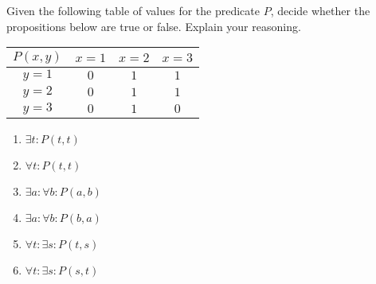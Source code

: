 	\begin{xca}
	
	Given the following table of values for the predicate $P$, decide whether the propositions below are true or false.  Explain your reasoning.
	
	\begin{table}[h!]
		\begin{center}
			\label{tab:table1}
			\begin{tabular}{c|c|c|c|}
				$P(x,y)$ &$x=1$ & $x=2$ & $x=3$  \\
				\hline
				$y=1$    &   $0$        &     $1$       &     $1$      \\
				\hline
				$y=2$   &    $0$       &     $1$        &    $1$      \\
				\hline
				$y=3$   &    $0$       &      $1$        &   $0$       \\
				\hline
			\end{tabular}
		\end{center}
	\end{table}
	
	\begin{enumerate}
		\item $\exists t: P(t,t)$
		\item $\forall t: P(t,t)$
		\item $\exists a: \forall b: P(a,b)$
		\item $\exists a: \forall b: P(b,a)$
		\item $\forall t: \exists s: P(t,s)$
		\item $\forall t: \exists s: P(s,t)$
	\end{enumerate}
	
	
\end{xca}

